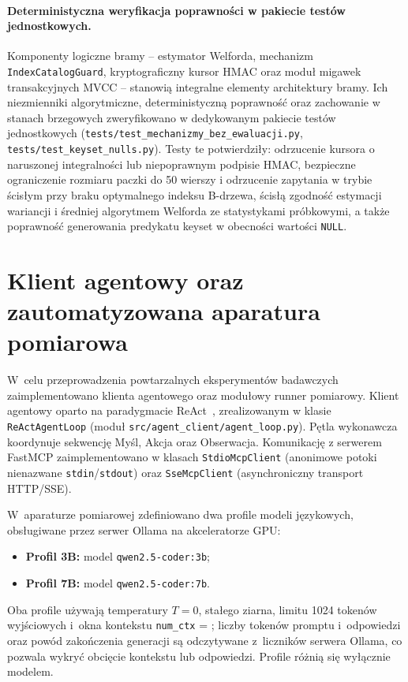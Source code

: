 \paragraph{Deterministyczna weryfikacja poprawności w pakiecie testów jednostkowych.} Komponenty logiczne bramy -- estymator Welforda, mechanizm \texttt{IndexCatalogGuard}, kryptograficzny kursor HMAC oraz moduł migawek transakcyjnych MVCC -- stanowią integralne elementy architektury bramy. Ich niezmienniki algorytmiczne, deterministyczną poprawność oraz zachowanie w stanach brzegowych zweryfikowano w dedykowanym pakiecie testów jednostkowych (\texttt{tests/test\_mechanizmy\_bez\_ewaluacji.py}, \texttt{tests/test\_keyset\_nulls.py}). Testy te potwierdziły: odrzucenie kursora o naruszonej integralności lub niepoprawnym podpisie HMAC, bezpieczne ograniczenie rozmiaru paczki do 50 wierszy i odrzucenie zapytania w trybie ścisłym przy braku optymalnego indeksu B-drzewa, ścisłą zgodność estymacji wariancji i średniej algorytmem Welforda ze statystykami próbkowymi, a także poprawność generowania predykatu keyset w obecności wartości \texttt{NULL}.


\section{Klient agentowy oraz zautomatyzowana aparatura pomiarowa}
\label{sec:klient_aparatura}

W~celu przeprowadzenia powtarzalnych eksperymentów badawczych zaimplementowano klienta agentowego oraz modułowy runner pomiarowy. Klient agentowy oparto na paradygmacie ReAct~\cite{yao2023react}, zrealizowanym w klasie \texttt{ReActAgentLoop} (moduł \texttt{src/agent\_client/agent\_loop.py}). Pętla wykonawcza koordynuje sekwencję Myśl, Akcja oraz Obserwacja. Komunikację z serwerem FastMCP zaimplementowano w klasach \texttt{StdioMcpClient} (anonimowe potoki nienazwane \texttt{stdin}/\texttt{stdout}) oraz \texttt{SseMcpClient} (asynchroniczny transport HTTP/SSE).

W~aparaturze pomiarowej zdefiniowano dwa profile modeli językowych, obsługiwane przez serwer Ollama na akceleratorze GPU:
\begin{itemize}
    \item \textbf{Profil 3B:} model \texttt{qwen2.5-coder:3b};
    \item \textbf{Profil 7B:} model \texttt{qwen2.5-coder:7b}.
\end{itemize}
Oba profile używają temperatury $T = 0$, stałego ziarna, limitu 1024 tokenów wyjściowych i~okna kontekstu \texttt{num\_ctx} = \wynNumCtx; liczby tokenów promptu i~odpowiedzi oraz powód zakończenia generacji są odczytywane z~liczników serwera Ollama, co pozwala wykryć obcięcie kontekstu lub odpowiedzi. Profile różnią się wyłącznie modelem.

